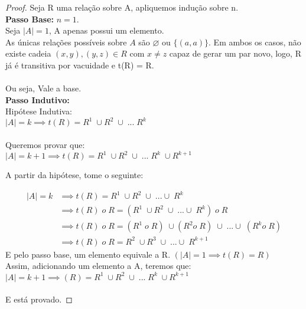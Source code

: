 \documentclass[12pt]{article}
\begin{document}
\begin{proof}
Seja R uma relação sobre A, apliquemos indução sobre n.
\\

\textbf{Passo Base:} $n=1$. \\
Seja $|A|= 1$, A apenas possui um elemento. \\
As únicas relações possíveis sobre $A$ são
$\varnothing$ ou $\{(a,a)\}$. Em ambos os casos, não existe cadeia $(x,y),(y,z)\in R$ com $x\ne z$ capaz de gerar um par novo, logo, R já é transitiva por vacuidade e t(R) = R.  
\\
\\
Ou seja, Vale a base.
\\
\textbf{Passo Indutivo:}
\\
Hipótese Indutiva: \\
$|A| = k \implies t(R)= R^1 \; \cup R^2 \; \cup \;... \; R^k$
\\
\\
Queremos provar que: \\
$|A| = k + 1 \implies t(R)= R^1 \; \cup R^2 \; \cup \;... \; R^k \; \cup R^{k+1}$

A partir da hipótese, tome o seguinte:

\begin{align}
    |A| = k
    &\implies t(R) = R^1 \; \cup R^2 \; \cup \; ... \cup \; R^k \\
    &\implies t(R) \; o  \;R = (R^1 \; \cup R^2 \; \cup \; ... \cup \; R^k) \; o \;R \\
    &\implies t(R) \; o  \;R = (R^1 \;o \; R)  \; \cup (R^2 o \; R) \; \cup \; ... \cup \; (R^k o \; R) \tag{Distrib.} \\
    &\implies t(R) \; o  \;R = R^2 \; \cup R^3 \; \cup \; ... \cup \; R^{k+1} 
\end{align}
E pelo passo base, um elemento equivale a R. $(|A| = 1 \implies t(R) = R)$ \\
Assim, adicionando um elemento a A, teremos que: \\
$|A| = k + 1 \implies(R)= R^1 \; \cup R^2 \; \cup \;... \; R^k \; \cup R^{k+1}$
\\
\\
E está provado.

\end{proof}
\end{document}
